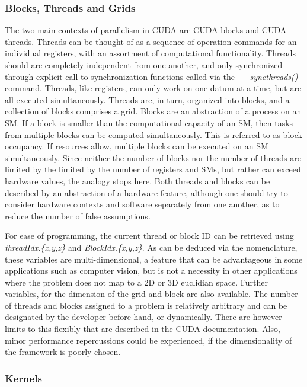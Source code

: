 \subsubsection{Blocks, Threads and Grids}\label{btg}
The two main contexts of parallelism in CUDA are CUDA blocks and CUDA threads.
Threads can be thought of as a sequence of operation commands for an individual registers, with an assortment of computational
functionality.  Threads should are completely independent from one another,
and only synchronized through explicit call to synchronization functions called via the \textit{\_\_syncthreads()} command. Threads, like
registers, can only work on one datum at a time, but are all executed simultaneously.
Threads are, in turn, organized into blocks, and a collection of blocks comprises a grid.
Blocks are an abstraction of a process on an SM.  If a block is smaller than
the computational capacity of an SM, then tasks from multiple blocks can be computed
simultaneously.  This is referred to as block occupancy.  If resources allow, multiple blocks can
be executed on an \Gls{SM} simultaneously. Since neither the number of blocks nor the
number of threads are limited by the limited by the number of registers and \Glspl{SM},
but rather can exceed hardware values, the analogy stops here.  Both
threads and blocks can be described by an abstraction of a hardware feature, although one should try to
consider hardware contexts and software separately from one another, as to reduce the number
of false assumptions.
\par
For ease of programming, the current thread or block ID can be retrieved using
 \textit{threadIdx.\{x,y,z\}} and \textit{BlockIdx.\{x,y,z\}}. As can be deduced via the nomenclature,
 these variables are multi-dimensional, a feature that can be advantageous in some
 applications such as computer vision, but is not a necessity in other applications
where the problem does not map to a 2D or 3D euclidian space. Further variables,
for the dimension of the grid and block are also available. %
The number of threads and blocks assigned to a problem is relatively arbitrary and can
be designated by the developer before hand, or dynamically.  There are however limits
to this flexibly that are described in the CUDA documentation\cite{bestpractices}.
  Also, minor performance
repercussions could be experienced, if the dimensionality of the framework is poorly
chosen.
\subsubsection{Kernels}

